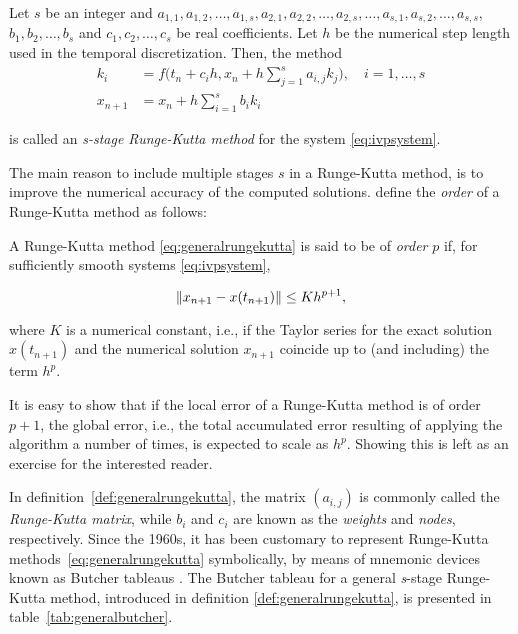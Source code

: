 \begin{defn}
    \label{def:generalrungekutta}
    Let $s$ be an integer and $a_{1,1},a_{1,2},\ldots,a_{1,s},a_{2,1},
    a_{2,2},\ldots,a_{2,s},\ldots,a_{s,1},a_{s,2},\ldots,a_{s,s}$,
    $b_{1},b_{2},\ldots,b_{s}$ and $c_{1},c_{2},\ldots,c_{s}$ be real
    coefficients. Let $h$ be the numerical step length used in the
    temporal discretization. Then, the method
\begin{equation}
    \label{eq:generalrungekutta}
    \begin{aligned}
        k_{i} &= f\bigg(t_{n}+c_{i}h,x_{n}+
                h\sum\limits_{j=1}^{s}a_{i,j}k_{j}\bigg),\quad{}i=1,\ldots,s\\
        x_{n+1} &= x_{n} + h\sum\limits_{i=1}^{s}b_{i}k_{i}
    \end{aligned}
\end{equation}

is called an \emph{s-stage Runge-Kutta method} for the system
\eqref{eq:ivpsystem}.
\end{defn}

The main reason to include multiple stages $s$ in a Runge-Kutta method,
is to improve the numerical accuracy of the computed solutions.
\textcite[p.134]{hairer1993solving} define the \emph{order}
of a Runge-Kutta method as follows:\\

\begin{defn}
    \label{def:rungekuttaorder}
    A Runge-Kutta method \eqref{eq:generalrungekutta} is said to be of
    \emph{order} $p$ if, for sufficiently smooth systems \eqref{eq:ivpsystem},

    \begin{equation}
        \label{eq:rungekuttaorder}
        \norm{x_{n+1}-x(t_{n+1})} \leq Kh^{p+1},
    \end{equation}

    where $K$ is a numerical constant, i.e., if the Taylor series for the exact
    solution $x(t_{n+1})$ and the numerical solution $x_{n+1}$ coincide up to
    (and including) the term $h^p$.
\end{defn}

It is easy to show that if the local error of a Runge-Kutta method is of order
$p+1$, the global error, i.e., the total accumulated error resulting of
applying the algorithm a number of times, is expected to scale as $h^{p}$.
Showing this is left as an exercise for the interested reader.

In definition~\ref{def:generalrungekutta}, the matrix $(a_{i,j})$ is commonly
called the \emph{Runge-Kutta matrix}, while $b_{i}$ and $c_{i}$ are known as
the \emph{weights} and \emph{nodes}, respectively.  Since the 1960s, it has
been customary to represent Runge-Kutta methods~\eqref{eq:generalrungekutta}
symbolically, by means of mnemonic devices known as Butcher tableaus
\parencite[p.134]{hairer1993solving}. The Butcher tableau
for a general \emph{s}-stage Runge-Kutta method, introduced in definition
\ref{def:generalrungekutta}, is presented in table~\ref{tab:generalbutcher}.

